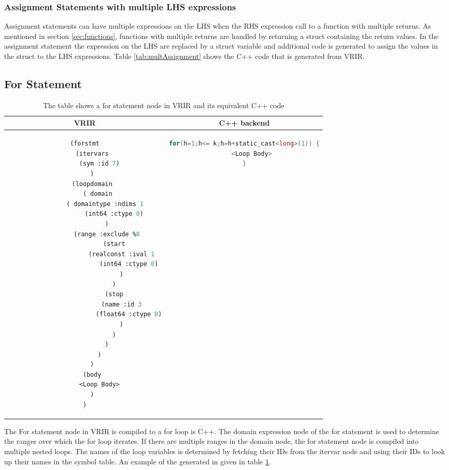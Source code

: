 \subsubsection{Assignment Statements with multiple LHS expressions}
Assignment statements can have multiple expressions on the LHS when the RHS expression call to a function  with multiple returns. As mentioned in section \ref{sec:functions}, functions with multiple returns are handled by returning a struct containing the return values. In the assignment statement the expression on the LHS are replaced by a struct variable and additional code is generated to assign the values in the struct to the LHS expressions. Table \ref{tab:multAssignment} shows the C++ code that is generated from VRIR.

\subsection{For Statement}
\begin{table}[htbp]
\begin{tabular}{|c|c|}
\hline 
VRIR & C++ backend \\
\hline 
{
\begin{lstlisting}[language=lisp, frame=none, numbers=none]
(forstmt
	(itervars
		(sym :id 7)
	)
	(loopdomain
		( domain 
			( domaintype :ndims 1 
				(int64 :ctype 0)
			)
			(range :exclude %0
				(start
					(realconst :ival 1
						(int64 :ctype 0)
					)
				)
				(stop
					(name :id 3
						(float64 :ctype 0)
					)
				)
			)
		)
	)
	(body
		<Loop Body>
	)
)

\end{lstlisting}
} & 
{
\begin{lstlisting}[language=c,frame=none, numbers=none]
for(h=1;h<= k;h=h+static_cast<long>(1)) {
	<Loop Body>
}
\end{lstlisting}
} \\
\hline
\end{tabular}
\caption[For Statement]{The table shows a for statement node in VRIR and its equivalent C++ code}
\label{tab:forStmt}
\end{table}
The For statement node in VRIR is compiled to a for loop is C++. The domain expression node of the for statement is used to determine the ranges over which the for loop iterates. If there are multiple ranges in the domain node, the for statement node is compiled into multiple nested loops. The names of the loop variables is determined by fetching their IDs from the itervar node and using their IDs to look up their names in the symbol table. An example of the generated in given in table \ref{tab:forStmt}.
